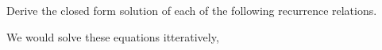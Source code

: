 \documentclass[addpoints]{exam}
\begin{document}
\begin{questions}
\begin{solution}
	\end{solution}

	\question Derive the closed form solution of each of the following recurrence relations.
	\begin{solution}
		We would solve these equations itteratively,
		\begin{parts}

\end{parts}
\end{solution}
\end{questions}
\end{document}
